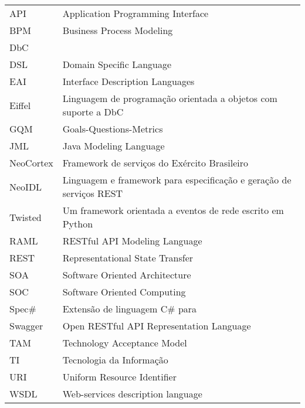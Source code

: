 {}

\newcommand{\acrlista}[1]{\vspace{12pt}\noindent #1\\}
\newcommand\tab[1][1cm]{\hspace*{#1}}


\begin{table}[!bth] 
\begin{tabular}{p{2cm}p{13cm}}
API & Application Programming Interface\\
BPM & Business Process Modeling\\
DbC & \designbycontract{}\\
DSL & Domain Specific Language\\
EAI & Interface Description Languages \\
Eiffel & Linguagem de programação orientada a objetos com suporte a
DbC\\
GQM & Goals-Questions-Metrics\\
JML & Java Modeling Language\\
NeoCortex & Framework de serviços do Exército Brasileiro\\
NeoIDL & Linguagem e framework para especificação e geração de serviços REST\\
Twisted & Um framework orientada a eventos de rede escrito em Python\\
RAML & RESTful API Modeling Language\\
REST & Representational State Transfer\\
SOA & Software Oriented Architecture\\
SOC & Software Oriented Computing\\
Spec\# & Extensão de linguagem C\# para \designbycontract{}\\
Swagger & Open RESTful API Representation Language\\
TAM & Technology Acceptance Model\\
TI & Tecnologia da Informação\\
URI & Uniform Resource Identifier\\
WSDL & Web-services description language\\

\end{tabular}
\end{table}

\pagebreak
